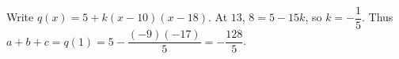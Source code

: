 Write $q(x)=5+k(x-10)(x-18)$. At $13$, $8=5-15k$, so $k=-\dfrac{1}{5}$. Thus $a+b+c=q(1)=5-\dfrac{(-9)(-17)}{5}=\boxed{-\dfrac{128}{5}}$.
